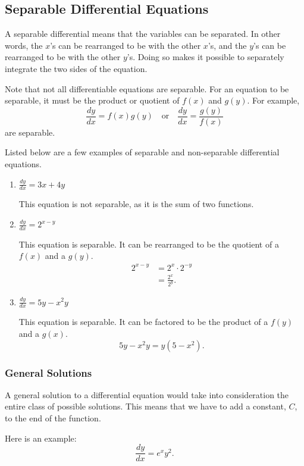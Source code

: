 \documentclass[12pt]{article}
\begin{document}
\subsection{Separable Differential Equations}
A separable differential means that the variables can be separated. In other words, the $x$'s can be rearranged to be with the other $x$'s, and the $y$'s can be rearranged to be with the other $y$'s. Doing so makes it possible to separately integrate the two sides of the equation.

Note that not all differentiable equations are separable. For an equation to be separable, it must be the product or quotient of $f(x)$ and $g(y)$. For example,
\[ \frac{dy}{dx} = f(x) g(y) \quad \text{or} \quad \frac{dy}{dx} = \frac{g(y)}{f(x)} \]
are separable.

Listed below are a few examples of separable and non-separable differential equations.
\begin{enumerate}
	\item $\frac{dy}{dx} = 3x + 4y$

	      This equation is not separable, as it is the sum of two functions.
	      \bigskip

	\item $\frac{dy}{dx} = 2^{x-y}$

	      This equation is separable. It can be rearranged to be the quotient of a $f(x)$ and a $g(y)$.
	      \begin{align*}
		      2^{x-y} & = 2^x \cdot 2^{-y} \\
		      & = \frac{2^x}{2^y}.
	      \end{align*}

	\item $\frac{dy}{dx} = 5y - x^2 y$

	      This equation is separable. It can be factored to be the product of a $f(y)$ and a $g(x)$.
	      \[ 5y - x^2 y = y(5-x^2). \]
\end{enumerate}

\subsubsection{General Solutions}
A general solution to a differential equation would take into consideration the entire class of possible solutions. This means that we have to add a constant, $C$, to the end of the function.

\noindent Here is an example:
\[ \frac{dy}{dx} = e^x y^2. \]
\end{document}
